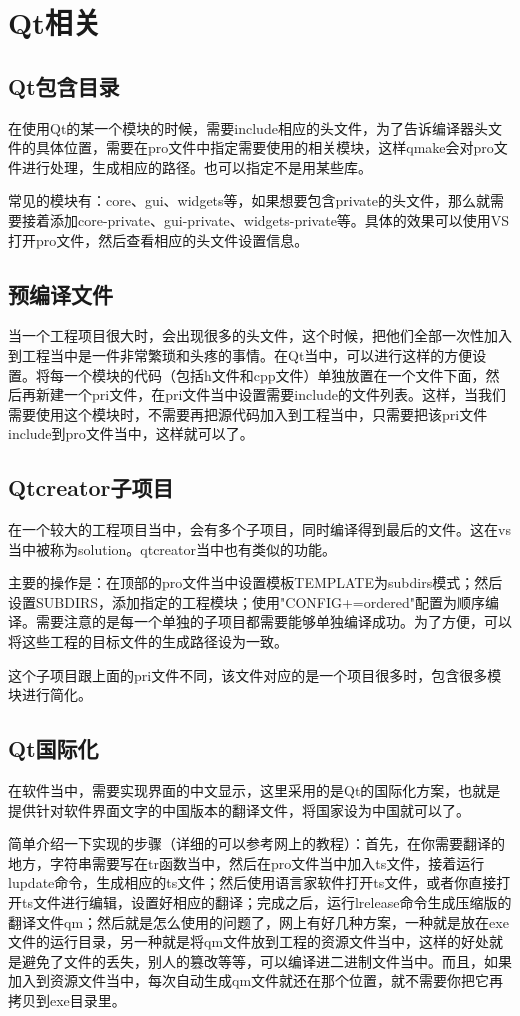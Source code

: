 \section{Qt相关}
\subsection{Qt包含目录}
在使用Qt的某一个模块的时候，需要include相应的头文件，为了告诉编译器头文件的具体位置，需要在pro文件中指定需要使用的相关模块，这样qmake会对pro文件进行处理，生成相应的路径。也可以指定不是用某些库。

常见的模块有：core、gui、widgets等，如果想要包含private的头文件，那么就需要接着添加core-private、gui-private、widgets-private等。具体的效果可以使用VS打开pro文件，然后查看相应的头文件设置信息。          

\subsection{预编译文件}
当一个工程项目很大时，会出现很多的头文件，这个时候，把他们全部一次性加入到工程当中是一件非常繁琐和头疼的事情。在Qt当中，可以进行这样的方便设置。将每一个模块的代码（包括h文件和cpp文件）单独放置在一个文件下面，然后再新建一个pri文件，在pri文件当中设置需要include的文件列表。这样，当我们需要使用这个模块时，不需要再把源代码加入到工程当中，只需要把该pri文件include到pro文件当中，这样就可以了。

\subsection{Qtcreator子项目}
在一个较大的工程项目当中，会有多个子项目，同时编译得到最后的文件。这在vs当中被称为solution。qtcreator当中也有类似的功能。

主要的操作是：在顶部的pro文件当中设置模板TEMPLATE为subdirs模式；然后设置SUBDIRS，添加指定的工程模块；使用"CONFIG+=ordered"配置为顺序编译。需要注意的是每一个单独的子项目都需要能够单独编译成功。为了方便，可以将这些工程的目标文件的生成路径设为一致。

这个子项目跟上面的pri文件不同，该文件对应的是一个项目很多时，包含很多模块进行简化。
\subsection{Qt国际化}
在软件当中，需要实现界面的中文显示，这里采用的是Qt的国际化方案，也就是提供针对软件界面文字的中国版本的翻译文件，将国家设为中国就可以了。

简单介绍一下实现的步骤（详细的可以参考网上的教程）：首先，在你需要翻译的地方，字符串需要写在tr函数当中，然后在pro文件当中加入ts文件，接着运行lupdate命令，生成相应的ts文件；然后使用语言家软件打开ts文件，或者你直接打开ts文件进行编辑，设置好相应的翻译；完成之后，运行lrelease命令生成压缩版的翻译文件qm；然后就是怎么使用的问题了，网上有好几种方案，一种就是放在exe文件的运行目录，另一种就是将qm文件放到工程的资源文件当中，这样的好处就是避免了文件的丢失，别人的篡改等等，可以编译进二进制文件当中。而且，如果加入到资源文件当中，每次自动生成qm文件就还在那个位置，就不需要你把它再拷贝到exe目录里。

